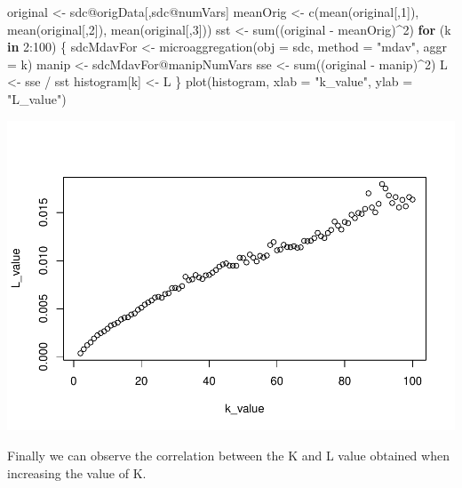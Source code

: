 \documentclass[
]{article}
\newenvironment{Shaded}{\begin{snugshade}}{\end{snugshade}}
\newcommand{\AttributeTok}[1]{\textcolor[rgb]{0.77,0.63,0.00}{#1}}
\newcommand{\ControlFlowTok}[1]{\textcolor[rgb]{0.13,0.29,0.53}{\textbf{#1}}}
\newcommand{\DecValTok}[1]{\textcolor[rgb]{0.00,0.00,0.81}{#1}}
\newcommand{\FunctionTok}[1]{\textcolor[rgb]{0.00,0.00,0.00}{#1}}
\newcommand{\NormalTok}[1]{#1}
\newcommand{\OtherTok}[1]{\textcolor[rgb]{0.56,0.35,0.01}{#1}}
\newcommand{\SpecialCharTok}[1]{\textcolor[rgb]{0.00,0.00,0.00}{#1}}
\newcommand{\StringTok}[1]{\textcolor[rgb]{0.31,0.60,0.02}{#1}}
\begin{document}
\begin{Shaded}
\begin{Highlighting}[]
\NormalTok{original }\OtherTok{\textless{}{-}}\NormalTok{ sdc}\SpecialCharTok{@}\NormalTok{origData[,sdc}\SpecialCharTok{@}\NormalTok{numVars]}
\NormalTok{meanOrig }\OtherTok{\textless{}{-}} \FunctionTok{c}\NormalTok{(}\FunctionTok{mean}\NormalTok{(original[,}\DecValTok{1}\NormalTok{]), }\FunctionTok{mean}\NormalTok{(original[,}\DecValTok{2}\NormalTok{]), }\FunctionTok{mean}\NormalTok{(original[,}\DecValTok{3}\NormalTok{]))}
\NormalTok{sst }\OtherTok{\textless{}{-}} \FunctionTok{sum}\NormalTok{((original }\SpecialCharTok{{-}}\NormalTok{ meanOrig)}\SpecialCharTok{\^{}}\DecValTok{2}\NormalTok{)}
\ControlFlowTok{for}\NormalTok{ (k }\ControlFlowTok{in} \DecValTok{2}\SpecialCharTok{:}\DecValTok{100}\NormalTok{) \{}
\NormalTok{  sdcMdavFor }\OtherTok{\textless{}{-}} \FunctionTok{microaggregation}\NormalTok{(}\AttributeTok{obj =}\NormalTok{ sdc, }\AttributeTok{method =} \StringTok{"mdav"}\NormalTok{, }\AttributeTok{aggr =}\NormalTok{ k)}
\NormalTok{  manip }\OtherTok{\textless{}{-}}\NormalTok{ sdcMdavFor}\SpecialCharTok{@}\NormalTok{manipNumVars}
\NormalTok{  sse }\OtherTok{\textless{}{-}} \FunctionTok{sum}\NormalTok{((original }\SpecialCharTok{{-}}\NormalTok{ manip)}\SpecialCharTok{\^{}}\DecValTok{2}\NormalTok{)}
\NormalTok{  L }\OtherTok{\textless{}{-}}\NormalTok{ sse }\SpecialCharTok{/}\NormalTok{ sst}
\NormalTok{  histogram[k] }\OtherTok{\textless{}{-}}\NormalTok{ L}
\NormalTok{\}}
\FunctionTok{plot}\NormalTok{(histogram, }\AttributeTok{xlab =} \StringTok{"k\_value"}\NormalTok{, }\AttributeTok{ylab =} \StringTok{"L\_value"}\NormalTok{)}
\end{Highlighting}
\end{Shaded}

\includegraphics{DP_Second_Laboratory_files/figure-latex/unnamed-chunk-17-1.pdf}

Finally we can observe the correlation between the K and L value
obtained when increasing the value of K.
\end{document}
